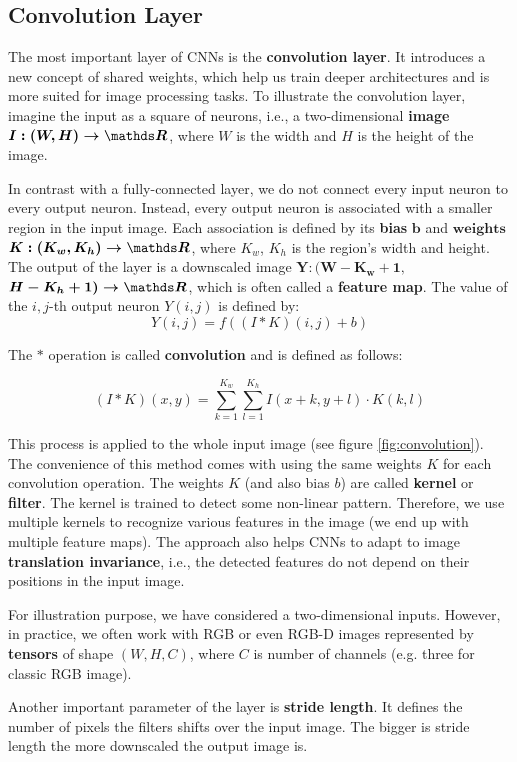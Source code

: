 \subsection{Convolution Layer}
The most important layer of CNNs is the \textbf{convolution layer}. It introduces a new concept of shared weights, which help us train deeper architectures and is more suited for image processing tasks. To illustrate the convolution layer, imagine the input as a square of neurons, i.e., a two-dimensional \textbf{image} $\boldsymbol{I: (W, H) \rightarrow \real}$, where ${W}$ is the width and ${H}$ is the height of the image. 

In contrast with a fully-connected layer, we do not connect every input neuron to every output neuron. Instead, every output neuron is associated with a smaller region in the input image. Each association is defined by its \textbf{bias} $\boldsymbol{b}$ and $\textbf{weights}$ $\boldsymbol{K:(K_w, K_h) \rightarrow \real}$, where $K_w$, $K_h$ is the region's width and height. The output of the layer is a downscaled image $\boldsymbol{Y:(W - K_w + 1,}$ $\boldsymbol{H - K_h + 1)  \rightarrow \real}$, which is often called a \textbf{feature map}. The value of the $i, j$-th output neuron $Y(i,j)$ is defined by: 
$$
Y(i, j) = f\left((I * K)(i,j) + b\right)
$$

The $*$ operation is called \textbf{convolution} and is defined as follows:

$$
(I * K)(x, y) = \sum\limits_{k = 1}^{K_w}\sum\limits_{l = 1}^{K_h} I(x + k, y + l) \cdot K(k, l)
$$

This process is applied to the whole input image (see figure \ref{fig:convolution}). The convenience of this method comes with using the same weights $K$ for each convolution operation. The weights $K$ (and also bias $b$) are called \textbf{kernel} or \textbf{filter}. The kernel is trained to detect some non-linear pattern. Therefore, we use multiple kernels to recognize various features in the image (we end up with multiple feature maps). The approach also helps CNNs to adapt to image \textbf{translation invariance}, i.e., the detected features do not depend on their positions in the input image.

For illustration purpose, we have considered a two-dimensional inputs. However, in practice, we often work with RGB or even RGB-D images represented by \textbf{tensors} of shape $(W, H, C)$, where $C$ is number of channels (e.g. three for classic RGB image). 

Another important parameter of the layer is \textbf{stride length}. It defines the number of pixels the filters shifts over the input image. The bigger is stride length the more downscaled the output image is.


